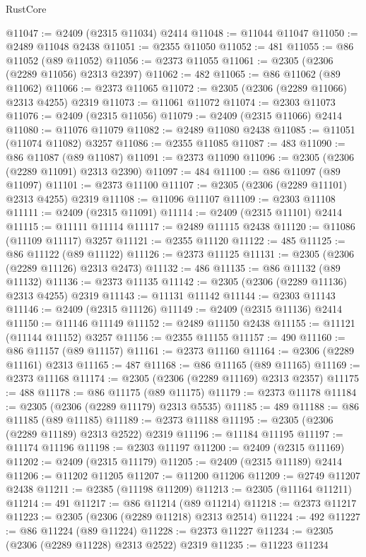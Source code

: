 \begin{lexlean}{RustCore}
\begin{coremodule}
@11047 := @2409 (@2315 @11034) @2414
@11048 := @11044 @11047
@11050 := @2489 @11048 @2438
@11051 := @2355 @11050
@11052 := 481
@11055 := @86 @11052 (@89 @11052)
@11056 := @2373 @11055
@11061 := @2305 (@2306 (@2289 @11056) @2313 @2397)
@11062 := 482
@11065 := @86 @11062 (@89 @11062)
@11066 := @2373 @11065
@11072 := @2305 (@2306 (@2289 @11066) @2313 @4255) @2319
@11073 := @11061 @11072
@11074 := @2303 @11073
@11076 := @2409 (@2315 @11056)
@11079 := @2409 (@2315 @11066) @2414
@11080 := @11076 @11079
@11082 := @2489 @11080 @2438
@11085 := @11051 (@11074 @11082) @3257
@11086 := @2355 @11085
@11087 := 483
@11090 := @86 @11087 (@89 @11087)
@11091 := @2373 @11090
@11096 := @2305 (@2306 (@2289 @11091) @2313 @2390)
@11097 := 484
@11100 := @86 @11097 (@89 @11097)
@11101 := @2373 @11100
@11107 := @2305 (@2306 (@2289 @11101) @2313 @4255) @2319
@11108 := @11096 @11107
@11109 := @2303 @11108
@11111 := @2409 (@2315 @11091)
@11114 := @2409 (@2315 @11101) @2414
@11115 := @11111 @11114
@11117 := @2489 @11115 @2438
@11120 := @11086 (@11109 @11117) @3257
@11121 := @2355 @11120
@11122 := 485
@11125 := @86 @11122 (@89 @11122)
@11126 := @2373 @11125
@11131 := @2305 (@2306 (@2289 @11126) @2313 @2473)
@11132 := 486
@11135 := @86 @11132 (@89 @11132)
@11136 := @2373 @11135
@11142 := @2305 (@2306 (@2289 @11136) @2313 @4255) @2319
@11143 := @11131 @11142
@11144 := @2303 @11143
@11146 := @2409 (@2315 @11126)
@11149 := @2409 (@2315 @11136) @2414
@11150 := @11146 @11149
@11152 := @2489 @11150 @2438
@11155 := @11121 (@11144 @11152) @3257
@11156 := @2355 @11155
@11157 := 490
@11160 := @86 @11157 (@89 @11157)
@11161 := @2373 @11160
@11164 := @2306 (@2289 @11161) @2313
@11165 := 487
@11168 := @86 @11165 (@89 @11165)
@11169 := @2373 @11168
@11174 := @2305 (@2306 (@2289 @11169) @2313 @2357)
@11175 := 488
@11178 := @86 @11175 (@89 @11175)
@11179 := @2373 @11178
@11184 := @2305 (@2306 (@2289 @11179) @2313 @5535)
@11185 := 489
@11188 := @86 @11185 (@89 @11185)
@11189 := @2373 @11188
@11195 := @2305 (@2306 (@2289 @11189) @2313 @2522) @2319
@11196 := @11184 @11195
@11197 := @11174 @11196
@11198 := @2303 @11197
@11200 := @2409 (@2315 @11169)
@11202 := @2409 (@2315 @11179)
@11205 := @2409 (@2315 @11189) @2414
@11206 := @11202 @11205
@11207 := @11200 @11206
@11209 := @2749 @11207 @2438
@11211 := @2385 (@11198 @11209)
@11213 := @2305 (@11164 @11211)
@11214 := 491
@11217 := @86 @11214 (@89 @11214)
@11218 := @2373 @11217
@11223 := @2305 (@2306 (@2289 @11218) @2313 @2514)
@11224 := 492
@11227 := @86 @11224 (@89 @11224)
@11228 := @2373 @11227
@11234 := @2305 (@2306 (@2289 @11228) @2313 @2522) @2319
@11235 := @11223 @11234

\end{coremodule}
\end{lexlean}
